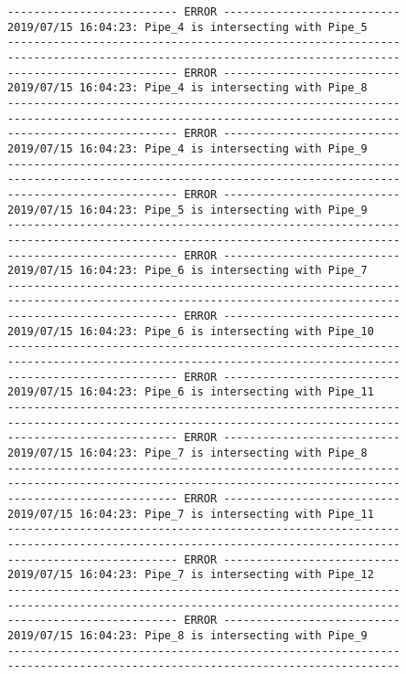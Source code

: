 \documentclass{article}
\begin{document}
{\begin{verbatim}
-------------------------- ERROR ---------------------------
2019/07/15 16:04:23: Pipe_4 is intersecting with Pipe_5
------------------------------------------------------------
------------------------------------------------------------
-------------------------- ERROR ---------------------------
2019/07/15 16:04:23: Pipe_4 is intersecting with Pipe_8
------------------------------------------------------------
------------------------------------------------------------
-------------------------- ERROR ---------------------------
2019/07/15 16:04:23: Pipe_4 is intersecting with Pipe_9
------------------------------------------------------------
------------------------------------------------------------
-------------------------- ERROR ---------------------------
2019/07/15 16:04:23: Pipe_5 is intersecting with Pipe_9
------------------------------------------------------------
------------------------------------------------------------
-------------------------- ERROR ---------------------------
2019/07/15 16:04:23: Pipe_6 is intersecting with Pipe_7
------------------------------------------------------------
------------------------------------------------------------
-------------------------- ERROR ---------------------------
2019/07/15 16:04:23: Pipe_6 is intersecting with Pipe_10
------------------------------------------------------------
------------------------------------------------------------
-------------------------- ERROR ---------------------------
2019/07/15 16:04:23: Pipe_6 is intersecting with Pipe_11
------------------------------------------------------------
------------------------------------------------------------
-------------------------- ERROR ---------------------------
2019/07/15 16:04:23: Pipe_7 is intersecting with Pipe_8
------------------------------------------------------------
------------------------------------------------------------
-------------------------- ERROR ---------------------------
2019/07/15 16:04:23: Pipe_7 is intersecting with Pipe_11
------------------------------------------------------------
------------------------------------------------------------
-------------------------- ERROR ---------------------------
2019/07/15 16:04:23: Pipe_7 is intersecting with Pipe_12
------------------------------------------------------------
------------------------------------------------------------
-------------------------- ERROR ---------------------------
2019/07/15 16:04:23: Pipe_8 is intersecting with Pipe_9
------------------------------------------------------------
------------------------------------------------------------

\end{verbatim}}
\end{document}
